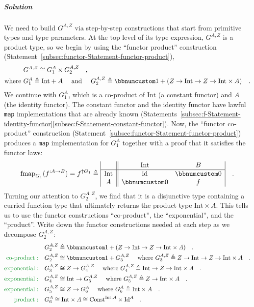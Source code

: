\subparagraph{Solution}

We need to build $G^{A,Z}$ via step-by-step constructions that start
from primitive types and type parameters. At the top level of its
type expression, $G^{A,Z}$ is a product type, so we begin by using
the \textsf{``}functor product\textsf{''} construction (Statement~\ref{subsec:functor-Statement-functor-product}),
\begin{align*}
 & G^{A,Z}\cong G_{1}^{A}\times G_{2}^{A,Z}\quad,\\
\text{where } & G_{1}^{A}\triangleq\text{Int}+A\quad\text{ and }\quad G_{2}^{A,Z}\triangleq\bbnum 1+(Z\rightarrow\text{Int}\rightarrow Z\rightarrow\text{Int}\times A)\quad.
\end{align*}
We continue with $G_{1}^{A}$, which is a co-product of $\text{Int}$
(a constant functor) and $A$ (the identity functor). The constant
functor and the identity functor have lawful \lstinline!map! implementations
that are already known (Statements~\ref{subsec:f-Statement-identity-functor}\textendash \ref{subsec:f-Statement-constant-functor}).
Now, the \textsf{``}functor co-product\textsf{''} construction (Statement~\ref{subsec:functor-Statement-functor-product})
produces a \lstinline!map! implementation for $G_{1}^{A}$ together
with a proof that it satisfies the functor laws:
\[
\text{fmap}_{G_{1}}(f^{:A\rightarrow B})=f^{\uparrow G_{1}}\triangleq\begin{array}{|c||cc|}
 & \text{Int} & B\\
\hline \text{Int} & \text{id} & \bbnum 0\\
A & \bbnum 0 & f
\end{array}\quad.
\]
Turning our attention to $G_{2}^{A,Z}$, we find that it is a disjunctive
type containing a curried function type that ultimately returns the
product type $\text{Int}\times A$. This tells us to use the functor
constructions \textsf{``}co-product\textsf{''}, the \textsf{``}exponential\textsf{''}, and the \textsf{``}product\textsf{''}.
Write down the functor constructions needed at each step as we decompose
$G_{2}^{A,Z}$:
\begin{align*}
 & G_{2}^{A,Z}\triangleq\bbnum 1+(Z\rightarrow\text{Int}\rightarrow Z\rightarrow\text{Int}\times A)\quad.\\
{\color{greenunder}\text{co-product}:}\quad & G_{2}^{A,Z}\cong\bbnum 1+G_{3}^{A,Z}\quad\text{ where }G_{3}^{A,Z}\triangleq Z\rightarrow\text{Int}\rightarrow Z\rightarrow\text{Int}\times A\quad.\\
{\color{greenunder}\text{exponential}:}\quad & G_{3}^{A,Z}\cong Z\rightarrow G_{4}^{A,Z}\quad\text{ where }G_{4}^{A,Z}\triangleq\text{Int}\rightarrow Z\rightarrow\text{Int}\times A\quad.\\
{\color{greenunder}\text{exponential}:}\quad & G_{4}^{A,Z}\cong\text{Int}\rightarrow G_{5}^{A,Z}\quad\text{ where }G_{5}^{A,Z}\triangleq Z\rightarrow\text{Int}\times A\quad.\\
{\color{greenunder}\text{exponential}:}\quad & G_{5}^{A,Z}\cong Z\rightarrow G_{6}^{A}\quad\text{ where }G_{6}^{A}\triangleq\text{Int}\times A\quad.\\
{\color{greenunder}\text{product}:}\quad & G_{6}^{A}\cong\text{Int}\times A\cong\text{Const}^{\text{Int},A}\times\text{Id}^{A}\quad.
\end{align*}
